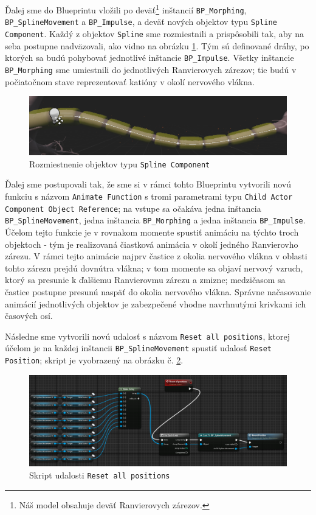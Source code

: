 Ďalej sme do Blueprintu vložili po deväť\footnote{Náš model obsahuje deväť Ranvierovych zárezov.} inštancií \texttt{BP\_Morphing}, \texttt{BP\_SplineMovement} a \texttt{BP\_Impulse}, a deväť nových objektov typu 
\texttt{Spline Component}.
Každý z objektov \texttt{Spline} sme rozmiestnili a prispôsobili tak, aby na seba postupne nadväzovali, ako vidno na obrázku \ref{splines}. Tým sú definované dráhy, po ktorých sa budú pohybovať jednotlivé inštancie 
\texttt{BP\_Impulse}. Všetky inštancie \texttt{BP\_Morphing} sme umiestnili do jednotlivých Ranvierovych zárezov; tie budú v počiatočnom stave reprezentovať katióny v okolí nervového vlákna. 

\begin{figure}[!htbp]
  \centering
  \includegraphics[width=15cm]{img/splines.png}
  \caption{Rozmiestnenie objektov typu \texttt{Spline Component}}
  \label{splines}
\end{figure}

Ďalej sme postupovali tak, že sme si v rámci tohto Blueprintu vytvorili novú funkciu s názvom \texttt{Animate Function} s tromi parametrami typu \texttt{Child Actor Component Object Reference}; na vstupe sa očakáva jedna inštancia
\texttt{BP\_SplineMovement}, jedna inštancia \texttt{BP\_Morphing} a jedna inštancia \texttt{BP\_Impulse}. Účelom tejto funkcie je v rovnakom momente spustiť animáciu na týchto troch objektoch - tým je realizovaná čiastková animácia
v okolí jedného Ranvierovho zárezu. V rámci tejto animácie najprv častice z okolia nervového vlákna v oblasti tohto zárezu prejdú dovnútra vlákna; v tom momente sa objaví nervový vzruch, ktorý sa presunie k ďalšiemu Ranvierovmu
zárezu a zmizne; medzičasom sa častice postupne presunú naspäť do okolia nervového vlákna. Správne načasovanie animácií jednotlivých objektov je zabezpečené vhodne navrhnutými krivkami ich časových osí.

Následne sme vytvorili novú udalosť s názvom \texttt{Reset all positions}, ktorej účelom je na každej inštancii \texttt{BP\_SplineMovement} spustiť udalosť \texttt{Reset Position}; skript je vyobrazený na obrázku č. \ref{resetall}.

\begin{figure}[!htbp]
  \centering
  \includegraphics[width=15cm]{img/resetall.png}
  \caption{Skript udalosti \texttt{Reset all positions}}
  \label{resetall}
\end{figure}

